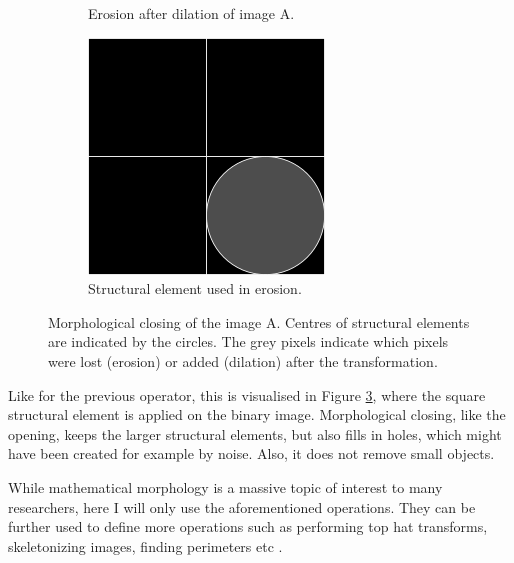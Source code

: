 \documentclass[
  digital,     %
  oneside,     %
  nosansbold,  %
  nocolorbold, %
  lof,         %
  lot,         %
]{fithesis4}
\begin{document}
\begin{figure}
\begin{subfigure}[t]{0.4\textwidth}
        \caption{Erosion after dilation of image A.}
        \label{fig:opening_dilation}
    \end{subfigure}
    \begin{subfigure}[t]{0.2\textwidth}
        \centering
        \includegraphics[width=\textwidth]{resources/inkscape/opening_dilation_se.png}
        \caption{Structural element used in erosion.}
        \label{fig:closing_dilation_se}
    \end{subfigure}
    \caption{Morphological closing of the image A. Centres of structural
    elements are indicated by the circles. The grey pixels indicate which pixels
    were lost (erosion) or added (dilation) after the transformation.}
    \label{fig:closing}
\end{figure}

Like for the previous operator, this is visualised in Figure \ref{fig:closing},
where the square structural element is applied on the binary image. 
Morphological closing, like the opening, keeps the larger structural elements,
but also fills in holes, which might have been created for example by noise.
Also, it does not remove small objects.

While mathematical morphology is a massive topic of interest to many
researchers, here I will only use the aforementioned operations. They can be
further used to define more operations such as performing top hat transforms,
skeletonizing images, finding perimeters etc \cite{mathworks_morp_oper}.
\end{document}
